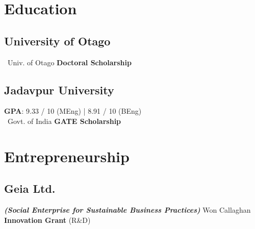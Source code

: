 \documentclass[letterpaper]{tap-resume}
\begin{document}

\lastupdated 



\begin{minipage}[t]{0.3333\textwidth} %


\section{Education} 

\subsection{University of Otago}

\textbullet \ Univ. of Otago \textbf{Doctoral Scholarship} \\ 


\sectionspace 
\sectionspace


\subsection{Jadavpur University}

\textbf{GPA}: 9.33 / 10 (MEng) | 8.91 / 10 (BEng) \\
\textbullet \ Govt. of India \textbf{GATE Scholarship}




\sectionspace


\section{Entrepreneurship}

\subsection{Geia Ltd.}
\footnotesize \textit{\textbf{(Social Enterprise for Sustainable Business Practices)}}
\textbullet Won Callaghan \textbf{Innovation Grant} (R\&D) \\



\end{minipage}
\end{document}
